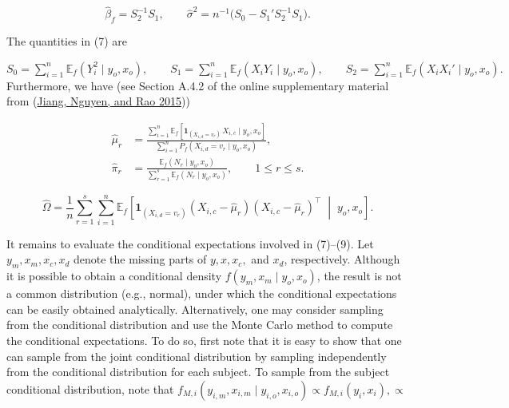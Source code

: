 \documentclass[
  12pt,
]{article}
\begin{document}
\begin{equation}
\hat{\beta}_f = S_2^{-1} S_1,
\qquad
\hat{\sigma}^2 = n^{-1} \big( S_0 - S_1' S_2^{-1} S_1 \big).
\tag{7}
\end{equation}

The quantities in (7) are

\(S_0 = \sum_{i=1}^{n} \mathbb{E}_f(Y_i^2 \mid y_o, x_o), \qquad S_1 = \sum_{i=1}^{n} \mathbb{E}_f(X_i Y_i \mid y_o, x_o), \qquad S_2 = \sum_{i=1}^{n} \mathbb{E}_f(X_i X_i' \mid y_o, x_o).\)
Furthermore, we have (see Section A.4.2 of the online supplementary
material from (\protect\hyperlink{ref-Sunilems}{Jiang, Nguyen, and Rao
2015}))

\begin{equation}
\begin{aligned}
\hat{\mu}_r
&= \frac{\sum_{i=1}^{n} \mathbb{E}_f\!\left[\mathbf{1}_{(X_{i,d}=v_r)}\, X_{i,c} \mid y_o, x_o \right]}
       {\sum_{i=1}^{n} P_f(X_{i,d} = v_r \mid y_o, x_o)}, \\[6pt]
\hat{\pi}_r
&= \frac{\mathbb{E}_f(N_r \mid y_o, x_o)}
       {\sum_{r=1}^{s} \mathbb{E}_f(N_r \mid y_o, x_o)},
\qquad 1 \le r \le s.
\end{aligned}
\tag{8}
\end{equation}

\begin{equation}
\hat{\Omega}
= \frac{1}{n} \sum_{r=1}^{s} \sum_{i=1}^{n}
\mathbb{E}_f \!\left[
\mathbf{1}_{(X_{i,d}=v_r)}
\left( X_{i,c} - \hat{\mu}_r \right)
\left( X_{i,c} - \hat{\mu}_r \right)^{\!\top}
\;\middle|\; y_o, x_o
\right].
\tag{9}
\end{equation}

It remains to evaluate the conditional expectations involved in
(7)--(9). Let \(y_m, x_m, x_c, x_d\) denote the missing parts of
\(y, x, x_c,\) and \(x_d\), respectively. Although it is possible to
obtain a conditional density \(f(y_m, x_m \mid y_o, x_o)\), the result
is not a common distribution (e.g., normal), under which the conditional
expectations can be easily obtained analytically. Alternatively, one may
consider sampling from the conditional distribution and use the Monte
Carlo method to compute the conditional expectations. To do so, first
note that it is easy to show that one can sample from the joint
conditional distribution by sampling independently from the conditional
distribution for each subject. To sample from the subject conditional
distribution, note that
\(f_{M,i}(y_{i,m}, x_{i,m} \mid y_{i,o}, x_{i,o}) \propto f_{M,i}(y_i, x_i), \propto\)
\end{document}
